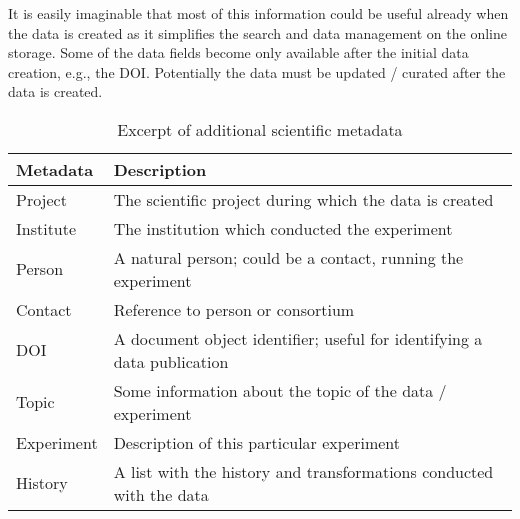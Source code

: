 It is easily imaginable that most of this information could be useful already when the data is created as it simplifies the search and data management on the online storage.
Some of the data fields become only available after the initial data creation, e.g., the DOI.
Potentially the data must be updated / curated after the data is created.

\begin{table}
\begin{tabular}{ll}
Metadata & Description\\
\hline
Project & The scientific project during which the data is created \\
Institute & The institution which conducted the experiment\\
Person &  A natural person; could be a contact, running the experiment \\
Contact & Reference to person or consortium \\
DOI      & A document object identifier; useful for identifying a data publication\\
Topic     & Some information about the topic of the data / experiment \\
Experiment & Description of this particular experiment \\
History & A list with the history and transformations conducted with the data \\
\end{tabular}
\caption{Excerpt of additional scientific metadata}
\label{tbl:additionalMetadata}
\end{table}
